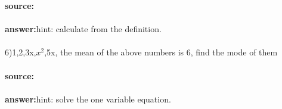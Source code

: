 \documentclass[11pt,fleqn]{book} %
\begin{document}
\textbf{source:}\\\\
\textbf{answer:}hint: calculate from the definition.\\\\
6)1,2,3x,$x^2$,5x, the mean of the above numbers is 6, find the mode of them\\\\
\textbf{source:}\\\\
\textbf{answer:}hint: solve the one variable equation.\\\\



\cleardoublepage
{}
\setlength{\columnsep}{0.75cm}
\printindex

\end{document}
